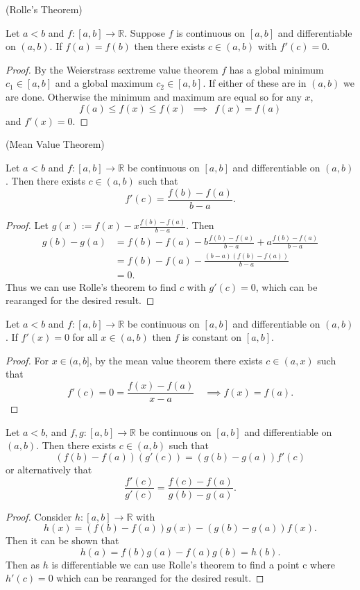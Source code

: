 \begin{theorem} (Rolle's Theorem)

  \noindent Let $a < b$ and $f : [a , b] \rightarrow \mathbb{R}$. Suppose $f$ is continuous on $[a,b]$ and differentiable on $(a, b)$. If $f(a) = f(b)$ then there exists $c \in (a, b)$ with $f'(c) = 0$.
\end{theorem}
\begin{proof}
  By the Weierstrass sextreme value theorem $f$ has a global minimum $c_1 \in [a,b]$ and a global maximum $c_2 \in [a,b]$. If either of these are in $(a,b)$ we are done. Otherwise the minimum and maximum are equal so for any $x$,
  \[f(a) \leq f(x) \leq f(x) \ \ \implies \ \ f(x) = f(a)\]
  and $f'(x) = 0$.
\end{proof}

\begin{theorem} (Mean Value Theorem)
    
  \noindent Let $a < b$ and $f : [a,b] \rightarrow \mathbb{R}$ be continuous on $[a,b]$ and differentiable on $(a,b)$. Then there exists $c \in (a,b)$ such that
  \[f'(c) = \frac{f(b) - f(a)}{b - a}.\]
\end{theorem}
\begin{proof}
    Let $g(x) := f(x) - x \frac{f(b) - f(a)}{b - a}$. Then
    \begin{align*}
      g(b) - g(a) &= f(b) - f(a) - b \frac{f(b) - f(a)}{b -a} + a \frac{f(b) - f(a)}{b -a}\\
       &= f(b) - f(a) - \frac{(b - a)(f(b) - f(a))}{b - a} \\
      &= 0
    .\end{align*}
    Thus we can use Rolle's theorem to find $c$ with $g'(c) = 0$, which can be rearanged for the desired result.
\end{proof}

\begin{corollary}
  Let $a < b$ and $f: [a,b] \rightarrow \mathbb{R}$ be continuous on $[a,b]$ and differentiable on $(a,b)$. If $f'(x) = 0$ for all $x \in (a,b)$ then $f$ is constant on $[a,b]$.
\end{corollary}
\begin{proof}
  For $x \in (a, b]$, by the mean value theorem there exists $c \in (a, x)$ such that
  \[f'(c) = 0 =  \frac{f(x) - f(a)}{x - a} \quad \implies f(x) = f(a).\]
\end{proof}

\begin{theorem}
  Let $a < b$, and $f,g : [a,b] \rightarrow \mathbb{R}$ be continuous on $[a,b]$ and differentiable on $(a,b)$. Then there exists $c \in (a,b)$ such that
  \[(f(b) -f(a))(g'(c)) = (g(b) - g(a))f'(c) \]
  or alternatively that
  \[\frac{f'(c)}{g'(c)} = \frac{f(c) - f(a)}{g(b) - g(a)}.\]
\end{theorem}
\begin{proof}
  Consider $h: [a,b] \rightarrow \mathbb{R}$ with
  \[h(x) = ( f(b) - f(a))g(x) - (g(b) - g(a))f(x).\]
  Then it can be shown that
  \[h(a) = f(b) g(a) - f(a) g(b) = h(b).\]
  Then as $h$ is differentiable we can use Rolle's theorem to find a point c where $h'(c) = 0$ which can be rearanged for the desired result.
\end{proof}
